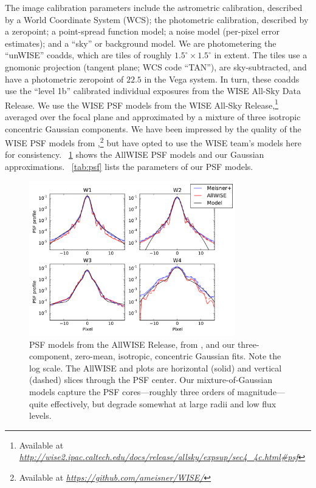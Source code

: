 \documentclass[12pt,preprint]{aastex}
\newcommand{\niceurl}[1]{\href{#1}{\textsl{#1}}}
\newcommand{\figref}[1]{\figurename~\ref{#1}}
\newcommand{\Figref}[1]{\figref{#1}}
\newcommand{\tabref}[1]{\tablename~\ref{#1}}
\newcommand{\Tableref}[1]{\tabref{#1}}
\begin{document}
The image calibration parameters include the astrometric calibration,
described by a World Coordinate System (WCS); the photometric
calibration, described by a zeropoint; a point-spread function model;
a noise model (per-pixel error estimates); and a ``sky'' or background
model.  We are photometering the ``unWISE'' coadds, which are tiles of
roughly $1.5^\circ \times 1.5^\circ$ in extent.  The tiles use a
gnomonic projection (tangent plane; WCS code ``TAN''), are
sky-subtracted, and have a photometric zeropoint of $22.5$ in the Vega
system.  In turn, these coadds use the ``level 1b'' calibrated
individual exposures from the WISE All-Sky Data Release.  
%
We use the WISE PSF models from the WISE All-Sky
Release,\footnote{Available at
  \niceurl{http://wise2.ipac.caltech.edu/docs/release/allsky/expsup/sec4\_4c.html\#psf}}
averaged over the focal plane and approximated by a mixture of three
isotropic concentric Gaussian components.
%
We have been impressed by the quality of the WISE PSF models from
\citet{meisner},\footnote{Available at
  \niceurl{https://github.com/ameisner/WISE/}} but have opted to use
the WISE team's models here for consistency.
%
\Figref{fig:psf} shows the AllWISE PSF models and our Gaussian
approximations.  \Tableref{tab:psf} lists the parameters of our PSF
models.


\begin{figure}
  \begin{center}
    \includegraphics[width=0.8\textwidth]{psf-00}
  \end{center}
  \caption{%
    PSF models from the AllWISE Release, from \citealt{meisner}, and
    our three-component, zero-mean, isotropic, concentric Gaussian
    fits.  Note the log scale.  The AllWISE and \citealt{meisner}
    plots are horizontal (solid) and vertical (dashed) slices through
    the PSF center.  Our mixture-of-Gaussian models capture the PSF
    cores---roughly three orders of magnitude---quite effectively, but
    degrade somewhat at large radii and low flux levels.
    \label{fig:psf}}
\end{figure}
\end{document}
